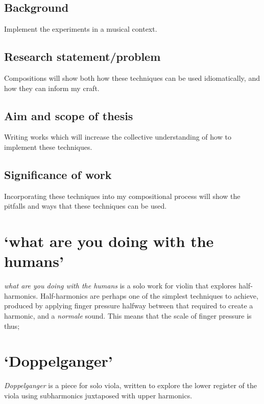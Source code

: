 \subsection{Background}
Implement the experiments in a musical context.
\subsection{Research statement/problem}
Compositions will show both how these techniques can be used idiomatically, and how they can inform my craft.
\subsection{Aim and scope of thesis}
Writing works which will increase the collective understanding of how to implement these techniques.
\subsection{Significance of work}
Incorporating these techniques into my compositional process will show the pitfalls and ways that these techniques can be used.

\section{`what are you doing with the humans'}
\emph{what are you doing with the humans} is a solo work for violin that explores half-harmonics.
Half-harmonics are perhaps one of the simplest techniques to achieve, produced by applying finger pressure halfway between that required to create a harmonic, and a \emph{normale} sound.
This means that the scale of finger pressure is thus;

\begin{table}[]
    \centering
    \caption{Finger Pressure \& Resultant Sound}
    \label{tab:finger-pressure}
    \end{table}

\section{`Doppelganger'}
\emph{Doppelganger} is a piece for solo viola, written to explore the lower register of the viola using subharmonics juxtaposed with upper harmonics. 

